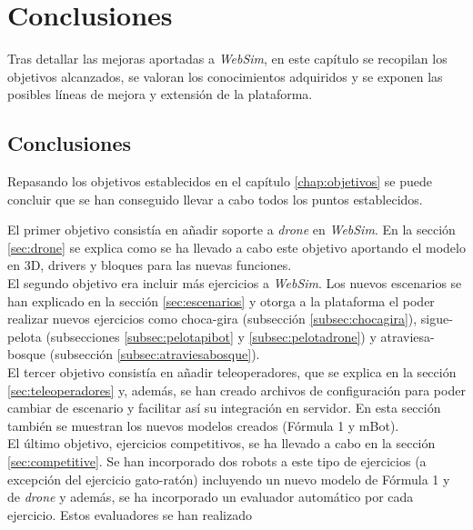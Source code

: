 \chapter{Conclusiones}
\label{chap:conclusiones}

Tras detallar las mejoras aportadas a \textit{WebSim}, en este capítulo se recopilan los objetivos alcanzados, se valoran los conocimientos adquiridos y se exponen las posibles líneas de mejora y extensión de la plataforma. 
\section{Conclusiones}

Repasando los objetivos establecidos en el capítulo \ref{chap:objetivos} se puede concluir que se han conseguido llevar a cabo todos los puntos establecidos. 

El primer objetivo consistía en añadir soporte a \textit{drone}  en \textit{WebSim}. En la sección \ref{sec:drone} se explica como se ha llevado a cabo este objetivo aportando el modelo en 3D, drivers y bloques para las nuevas funciones. \\

El segundo objetivo era incluir más ejercicios a \textit{WebSim}. Los nuevos escenarios se han explicado en la sección \ref{sec:escenarios} y otorga a la plataforma el poder realizar nuevos ejercicios como choca-gira (subsección \ref{subsec:chocagira}), sigue-pelota (subsecciones \ref{subsec:pelotapibot} y \ref{subsec:pelotadrone}) y atraviesa-bosque (subsección \ref{subsec:atraviesabosque}).  \\

El tercer objetivo consistía en añadir teleoperadores, que se explica en la sección \ref{sec:teleoperadores} y, además, se han creado archivos de configuración para poder cambiar de escenario y facilitar así su integración en servidor. En esta sección también se muestran los nuevos modelos creados (Fórmula 1 y mBot). \\

El último objetivo, ejercicios competitivos, se ha llevado a cabo en la sección \ref{sec:competitive}. Se han incorporado dos robots a este tipo de ejercicios (a excepción del ejercicio gato-ratón) incluyendo un nuevo modelo de Fórmula 1 y de \textit{drone} y además, se ha incorporado un evaluador automático por cada ejercicio. Estos evaluadores se han realizado  \\

